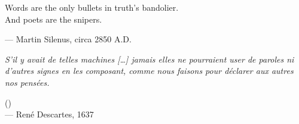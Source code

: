 \begin{flushright}
\begin{hangleftquote}{\EQOpen}{\EQClose}
Words are the only bullets in truth's bandolier.\\
And poets are the snipers.
\end{hangleftquote}
\par\smallskip
\normalfont — Martin Silenus, circa 2850 A.D.
\end{flushright}

\vspace{2em}

\begin{flushright}
\textit{S'il y avait de telles machines [\ldots] jamais elles ne pourraient user de paroles ni d'autres signes en les composant, comme nous faisons pour déclarer aux autres nos pensées.} \\
\par\smallskip
() \\
— René Descartes, 1637
\end{flushright}
